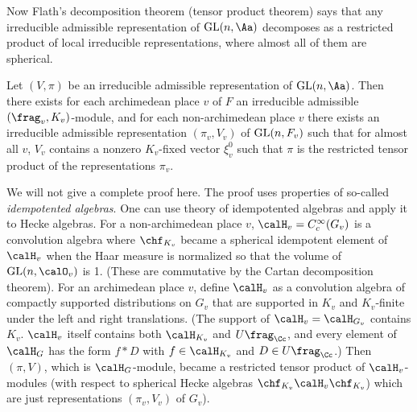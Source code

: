 Now Flath's decomposition theorem (tensor product theorem) says that any irreducible admissible representation of $\GL(n, \Aa)$ decomposes as a restricted product of local irreducible representations, where almost all of them are spherical. 

\begin{theorem}
Let $(V, \pi)$ be an irreducible admissible representation of $\GL(n, \Aa)$. Then there exists for each archimedean place $v$ of $F$ an irreducible admissible $(\frag_{v}, K_{v})$-module, and for each non-archimedean place $v$ there exists an irreducible admissible representation $(\pi_{v}, V_{v})$ of $\mathrm{GL}(n, F_{v})$ such that for almost all $v$, $V_{v}$ contains a nonzero $K_{v}$-fixed vector $\xi_{v}^{0}$ such that $\pi$ is the restricted tensor product of the representations $\pi_{v}$. 
\end{theorem}
We will not give a complete proof here. The proof uses properties of so-called \emph{idempotented algebras}. One can use theory of idempotented algebras and apply it to Hecke algebras. 
For a non-archimedean place $v$, $\calH_{v} = C_{c}^{\infty}(G_{v})$ is a convolution algebra where $\chf_{K_{v}}$ became a spherical idempotent element of $\calH_{v}$ when the Haar measure is normalized so that the volume of $\GL(n, \calO_{v})$ is 1. (These are commutative by the Cartan decomposition theorem). 
For an archimedean place $v$, define $\calH_{v}$ as a convolution algebra of compactly supported distributions on $G_{v}$ that are supported in $K_{v}$ and $K_{v}$-finite under the left and right translations. 
(The support of $\calH_{v} = \calH_{G_{v}}$ contains $K_{v}$. $\calH_{v}$ itself contains both $\calH_{K_{v}}$ and $U\frag_{\Cc}$, and every element of $\calH_{G}$ has the form $f * D$ with $f\in \calH_{K_{v}}$ and $D\in U\frag_{\Cc}$.)
Then $(\pi, V)$, which is $\calH_{G}$-module, became a restricted tensor product of $\calH_{v}$-modules (with respect to spherical Hecke algebras $\chf_{K_{v}}\calH_{v} \chf_{K_{v}}$) which are just representations $(\pi_{v}, V_{v})$ of $G_{v}$).  


